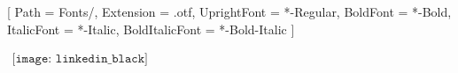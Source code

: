 \usepackage{graphicx}
\graphicspath{ {./Images/} }

\setmainfont{Charter}[
Path = Fonts/,
Extension = .otf,
UprightFont = *-Regular,
BoldFont = *-Bold,
ItalicFont = *-Italic,
BoldItalicFont = *-Bold-Italic
]


        $
        \begin{array}{l}
        \texttt{[image: linkedin\_black]}
        \end{array}
        $

